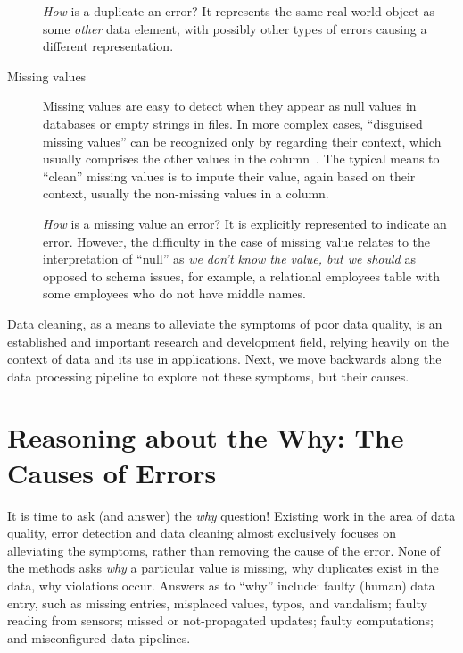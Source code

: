 \documentclass[11pt]{article}
\begin{document}
\begin{description}
  \emph{How} is a duplicate an error? It represents the same real-world object as some \emph{other} data element, with possibly other types of errors causing a different representation.
  
  \item[Missing values] Missing values are easy to detect when they appear as null values in databases or empty strings in files. In more complex cases, ``disguised missing values'' can be recognized only by regarding their context, which usually comprises the other values in the column~\cite{FAHES_18}. 
  The typical means to ``clean'' missing values is to impute their value, again based on their context, usually the non-missing values in a column.
  
  \emph{How} is a missing value an error? It is explicitly represented to indicate an error. However, the difficulty in the case of missing value relates to the interpretation of ``null'' as {\em we don't know the value, but we should} as opposed to schema issues, for example, a relational employees table with some employees who do not have middle names.
\end{description}

Data cleaning, as a means to alleviate the symptoms of poor data quality, is an established and important research and development field, relying heavily on the context of data and its use in applications. Next, we move backwards along the data processing pipeline to explore not these symptoms, but their causes.

%
\section{Reasoning about the Why: The Causes of Errors}
\label{sec:why}

It is time to ask (and answer) the \emph{why} question!
Existing work in the area of data quality, error detection and data cleaning almost exclusively focuses on alleviating the symptoms, rather than removing the cause of the error.
None of the methods asks \emph{why} a particular value is missing, why duplicates exist in the data, why violations occur. Answers as to ``why'' include: faulty (human) data entry, such as missing entries, misplaced values, typos, and vandalism; faulty reading from sensors; missed or not-propagated updates; faulty computations; and misconfigured data pipelines. 
\end{document}
